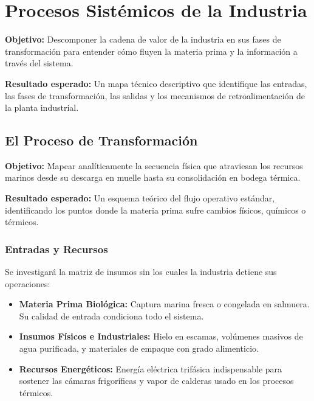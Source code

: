 \documentclass[11pt,a4paper]{article}
\newcommand{\objetivo}[1]{\noindent\textbf{\textcolor{blue!60!black}{Objetivo:}} #1\par\vspace{0.1cm}}
\newcommand{\resultado}[1]{\noindent\textbf{\textcolor{green!50!black}{Resultado esperado:}} #1\par\vspace{0.4cm}}
\begin{document}
\section{Procesos Sistémicos de la Industria }
\objetivo{Descomponer la cadena de valor de la industria en sus fases de transformación para entender cómo fluyen la materia prima y la información a través del sistema.}
\resultado{Un mapa técnico descriptivo que identifique las entradas, las fases de transformación, las salidas y los mecanismos de retroalimentación de la planta industrial.}

\subsection{El Proceso de Transformación}
\objetivo{Mapear analíticamente la secuencia física que atraviesan los recursos marinos desde su descarga en muelle hasta su consolidación en bodega térmica.}
\resultado{Un esquema teórico del flujo operativo estándar, identificando los puntos donde la materia prima sufre cambios físicos, químicos o térmicos.}

\subsubsection{Entradas y Recursos }
Se investigará la matriz de insumos sin los cuales la industria detiene sus operaciones:
\begin{itemize}[noitemsep]
    \item \textbf{Materia Prima Biológica:} Captura marina fresca o congelada en salmuera. Su calidad de entrada condiciona todo el sistema.
    \item \textbf{Insumos Físicos e Industriales:} Hielo en escamas, volúmenes masivos de agua purificada, y materiales de empaque con grado alimenticio.
    \item \textbf{Recursos Energéticos:} Energía eléctrica trifásica indispensable para sostener las cámaras frigoríficas y vapor de calderas usado en los procesos térmicos.
\end{itemize}
\end{document}
